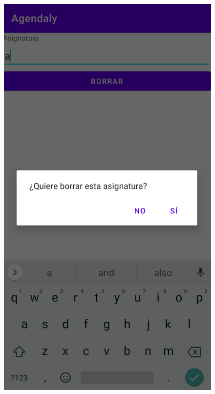 \documentclass[a4paper,openright,12pt]{article}
\begin{document}
\begin{figure}
            \includegraphics[scale=0.05]{avisoBorr.png}

\end{figure}
\end{document}
